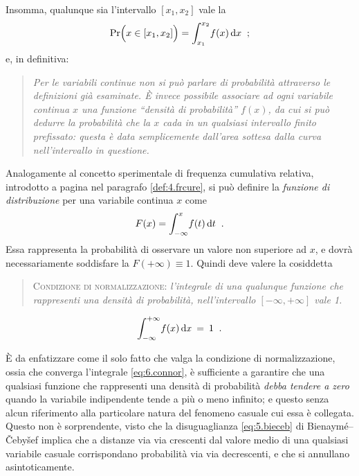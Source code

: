 Insomma, qualunque sia l'intervallo $ [ x_1, x_2 ] $ vale la
\begin{equation*}
  \Pr \Bigl(x \in  [x_1,x_2] \Bigr) =
  \int_{x_1}^{x_2} \! f(x) \, \mathrm{d} x \;\; ;
\end{equation*}
e, in definitiva:
\begin{quote}
  \textit{Per le variabili continue non si pu\`o parlare di
    probabilit\`a attraverso le definizioni gi\`a esaminate.
    \`E invece possibile associare ad ogni variabile
    continua $x$ una funzione ``densit\`a di probabilit\`a''
    $f(x)$, da cui si pu\`o dedurre la probabilit\`a che la
    $x$ cada in un qualsiasi intervallo finito prefissato:
    questa \`e data semplicemente dall'area sottesa dalla
    curva nell'intervallo in questione.}
\end{quote}%

%
\label{def:6.fundis}
Analogamente al concetto sperimentale di frequenza
cumulativa relativa, introdotto a pagina
\pageref{def:4.frcure} nel paragrafo \ref{def:4.frcure}, si
pu\`o definire la \emph{funzione di distribuzione} per una
variabile continua $x$ come
\begin{equation*}
  F(x) = \int_{- \infty}^x \! f(t) \, \mathrm{d} t \;\; .
\end{equation*}
Essa rappresenta la probabilit\`a di osservare un valore non
superiore ad $x$, e dovr\`a necessariamente soddisfare la
$F(+ \infty) \equiv 1$.  Quindi deve valere la cosiddetta
\begin{quote}
  \textsc{Condizione di normalizzazione:}%
  \textit{l'integrale di una qualunque funzione che
    rappresenti una densit\`a di probabilit\`a,
    nell'intervallo $ \left[ -\infty, +\infty \right]$ vale
    1.}
\end{quote}
\begin{equation} \label{eq:6.connor}
  \int_{- \infty}^{+ \infty} \! f(x) \, \mathrm{d} x \: = \: 1 \;\;
  .
\end{equation}%

\`E da enfatizzare come il solo fatto che valga la
condizione di normalizzazione, ossia che converga
l'integrale \eqref{eq:6.connor}, \`e sufficiente a garantire
che una qualsiasi funzione che rappresenti una densit\`a di
probabilit\`a \emph{debba tendere a zero} quando la
variabile indipendente tende a pi\`u o meno infinito; e
questo senza alcun riferimento alla particolare natura del
fenomeno casuale cui essa \`e collegata.  Questo non \`e
sorprendente, visto che la disuguaglianza
\eqref{eq:5.bieceb} di Bienaym\'e--\v Ceby\v sef implica che
a distanze via via crescenti dal valore medio di una
qualsiasi variabile casuale corrispondano probabilit\`a via
via decrescenti, e che si annullano asintoticamente.

